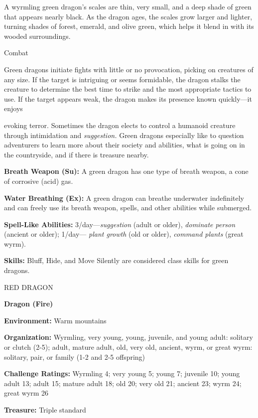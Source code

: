 \documentclass{article}
\begin{document}
A wyrmling green dragon's scales are thin, very small, and a deep shade of green 
that appears nearly black. As the dragon ages, the scales grow larger and lighter, 
turning shades of forest, emerald, and olive green, which helps it blend in with 
its wooded surroundings.

Combat

Green dragons initiate fights with little or no provocation, picking on creatures 
of any size. If the target is intriguing or seems formidable, the dragon stalks 
the creature to determine the best time to strike and the most appropriate tactics 
to use. If the target appears weak, the dragon makes its presence known quickly---it 
enjoys

evoking terror. Sometimes the dragon elects to control a humanoid creature through 
intimidation and \textit{suggestion. }Green dragons especially like to question 
adventurers to learn more about their society and abilities, what is going on in 
the countryside, and if there is treasure nearby.

\textbf{Breath Weapon (Su):} A green dragon has one type of breath weapon, a cone 
of corrosive (acid) gas.

\textbf{Water Breathing (Ex):} A green dragon can breathe underwater indefinitely 
and can freely use its breath weapon, spells, and other abilities while submerged.

\textbf{Spell-Like Abilities:} 3/day---\textit{suggestion }(adult or older), \textit{dominate 
person }(ancient or older); 1/day--- \textit{plant growth }(old or older), \textit{command 
plants }(great wyrm).

\textbf{Skills:} Bluff, Hide, and Move Silently are considered class skills for 
green dragons.

\vspace{12pt}
RED DRAGON

\textbf{Dragon (Fire)}

\textbf{Environment: }Warm mountains

\textbf{Organization:} Wyrmling, very young, young, juvenile, and young adult: 
solitary or clutch (2-5); adult, mature adult, old, very old, ancient, wyrm, or 
great wyrm: solitary, pair, or family (1-2 and 2-5 offspring)

\textbf{Challenge Ratings:} Wyrmling 4; very young 5; young 7; juvenile 10; young 
adult 13; adult 15; mature adult 18; old 20; very old 21; ancient 23; wyrm 24; 
great wyrm 26

\textbf{Treasure:} Triple standard
\end{document}
